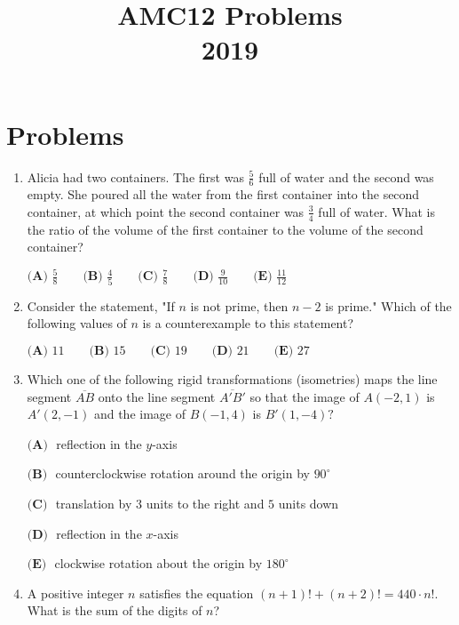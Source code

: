 \documentclass{article}
\title{AMC12 Problems \\ 2019}
\date{}
\begin{document}
\maketitle\thispagestyle{fancy}\newpage\section*{Problems}\begin{enumerate}[label=\arabic*., itemsep=0.5em]\item Alicia had two containers. The first was \(\tfrac{5}{6}\) full of water and the second was empty. She poured all the water from the first container into the second container, at which point the second container was \(\tfrac{3}{4}\) full of water. What is the ratio of the volume of the first container to the volume of the second container?

\(\textbf{(A) } \frac{5}{8} \qquad \textbf{(B) } \frac{4}{5} \qquad \textbf{(C) } \frac{7}{8} \qquad \textbf{(D) } \frac{9}{10} \qquad \textbf{(E) } \frac{11}{12}\)\par \vspace{0.5em}\item Consider the statement, "If \(n\) is not prime, then \(n-2\) is prime." Which of the following values of \(n\) is a counterexample to this statement?

\(\textbf{(A) } 11 \qquad \textbf{(B) } 15 \qquad \textbf{(C) } 19 \qquad \textbf{(D) } 21 \qquad \textbf{(E) } 27\)\par \vspace{0.5em}\item Which one of the following rigid transformations (isometries) maps the line segment \(\overline{AB}\) onto the line segment \(\overline{A'B'}\) so that the image of \(A(-2,1)\) is \(A'(2,-1)\) and the image of \(B(-1,4)\) is \(B'(1,-4)?\)

\(\textbf{(A) } \) reflection in the \(y\)-axis

\(\textbf{(B) } \) counterclockwise rotation around the origin by \(90^{\circ}\)

\(\textbf{(C) } \) translation by \(3\) units to the right and \(5\) units down

\(\textbf{(D) } \) reflection in the \(x\)-axis

\(\textbf{(E) } \) clockwise rotation about the origin by \(180^{\circ}\)\par \vspace{0.5em}\item A positive integer \(n\) satisfies the equation \((n+1)!+(n+2)!=440\cdot n!\). What is the sum of the digits of \(n\)?


\end{enumerate}
\end{document}
